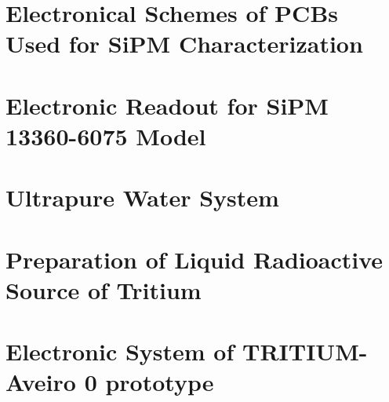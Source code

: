 \documentclass[12pt,a4paper]{book}
\begin{document}
\chapter{Electronical Schemes of PCBs Used for SiPM Characterization}\label{App:ElectronicalSchemesSiPMPCBs}


\chapter{Electronic Readout for SiPM 13360-6075 Model}\label{App:ElectronicReadoutSiPM}


\chapter{Ultrapure Water System}\label{App:UltraPureWaterSystem}


\chapter{Preparation of Liquid Radioactive Source of Tritium}\label{App:TritiumSourcePreparation}


\chapter{Electronic System of TRITIUM-Aveiro 0 prototype}\label{App:ElectronicSystemAveiro}


%

%




\end{document}
